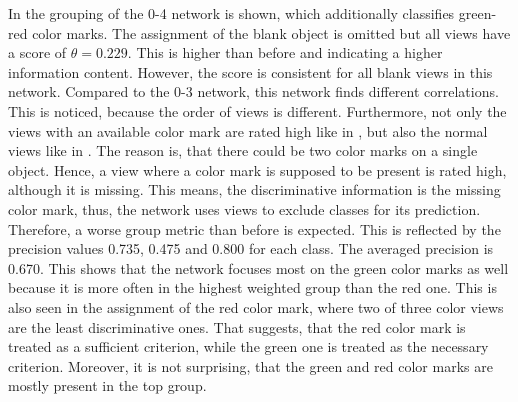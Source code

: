 In  the grouping of the 0-4 network is shown, which additionally classifies green-red color marks.
The assignment of the blank object is omitted but all views have a score of $\theta=0.229$.
This is higher than before and indicating a higher information content.
However, the score is consistent for all blank views in this network.
Compared to the 0-3 network, this network finds different correlations.
This is noticed, because the order of views is different.
Furthermore, not only the views with an available color mark are rated high like in , but also the normal views like in .
The reason is, that there could be two color marks on a single object.
Hence, a view where a color mark is supposed to be present is rated high, although it is missing.
This means, the discriminative information is the missing color mark, thus, the network uses views to exclude classes for its prediction.
Therefore, a worse group metric than before is expected.
This is reflected by the precision values 0.735, 0.475 and 0.800 for each class.
The averaged precision is 0.670.
This shows that the network focuses most on the green color marks as well because it is more often in the highest weighted group than the red one.
This is also seen in the assignment of the red color mark, where two of three color views are the least discriminative ones.
That suggests, that the red color mark is treated as a sufficient criterion, while the green one is treated as the necessary criterion.
Moreover, it is not surprising, that the green and red color marks are mostly present in the top group.
